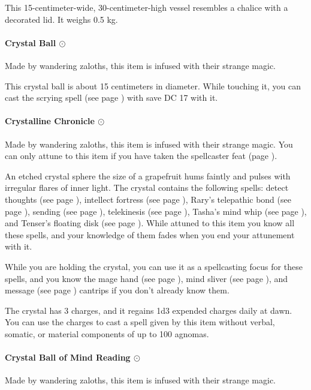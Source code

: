         This 15-centimeter-wide, 30-centimeter-high vessel resembles a chalice with a decorated lid.
        It weighs 0.5 kg.
    \paragraph{Crystal Ball $\odot$}
        Made by wandering zaloths, this item is infused with their strange magic.

        This crystal ball is about 15 centimeters in diameter.
        While touching it, you can cast the scrying spell (see page \pageref{spell::scrying}) with save DC 17 with it.
    \paragraph{Crystalline Chronicle $\odot$}
        Made by wandering zaloths, this item is infused with their strange magic.
        You can only attune to this item if you have taken the spellcaster feat (page \pageref{feat::spellcaster}).

        An etched crystal sphere the size of a grapefruit hums faintly and pulses with irregular flares of inner light.
        The crystal contains the following spells: detect thoughts (see page \pageref{spell::detectthoughts}), intellect fortress (see page \pageref{spell::intellectfortress}), Rary's telepathic bond (see page \pageref{spell::rarystelepathicbond}), sending (see page \pageref{spell::sending}), telekinesis (see page \pageref{spell::telekinesis}), Tasha's mind whip (see page \pageref{spell::tashasmindwhip}), and Tenser's floating disk (see page \pageref{spell::tensersfloatingdisc}).
        While attuned to this item you know all these spells, and your knowledge of them fades when you end your attunement with it.

        While you are holding the crystal, you can use it as a spellcasting focus for these spells, and you know the mage hand (see page \pageref{spell::magehand}), mind sliver (see page \pageref{spell::mindsliver}), and message (see page \pageref{spell::message}) cantrips if you don't already know them.

        The crystal has 3 charges, and it regains 1d3 expended charges daily at dawn.
        You can use the charges to cast a spell given by this item without verbal, somatic, or material components of up to 100 agnomas.
    \paragraph{Crystal Ball of Mind Reading $\odot$}
        Made by wandering zaloths, this item is infused with their strange magic.

